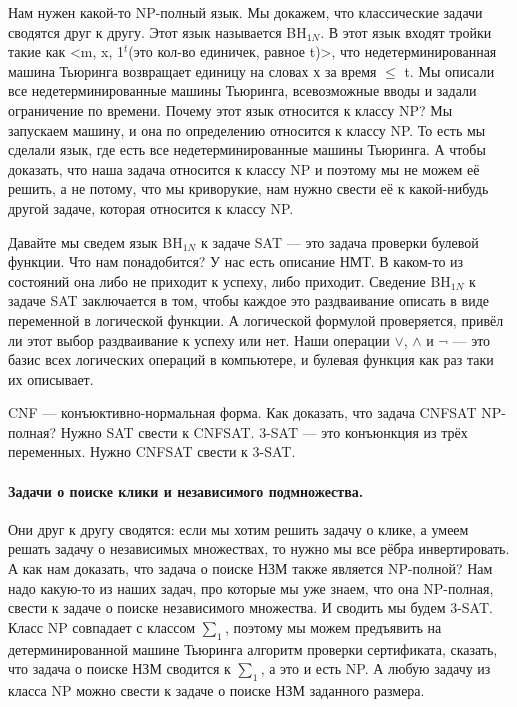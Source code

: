 \documentclass[12pt]{article}
\begin{document}
Нам нужен какой-то NP-полный язык. Мы докажем, что классические задачи сводятся друг к другу. Этот язык называется BH$_{1N}$. В этот язык входят тройки такие как <m, x, 1$^t$(это кол-во единичек, равное t)>, что недетерминированная машина Тьюринга возвращает единицу на словах х за время $\leq$ t. Мы описали все недетерминированные машины Тьюринга, всевозможные вводы и задали ограничение по времени. Почему этот язык относится к классу NP? Мы запускаем машину, и она по определению относится к классу NP. То есть мы сделали язык, где есть все недетерминированные машины Тьюринга. А чтобы доказать, что наша задача относится к классу NP и поэтому мы не можем её решить, а не потому, что мы криворукие, нам нужно свести её к какой-нибудь другой задаче, которая относится к классу NP.

Давайте мы сведем язык BH$_{1N}$ к задаче SAT --- это задача проверки булевой функции. Что нам понадобится? У нас есть описание НМТ. В каком-то из состояний она либо не приходит к успеху, либо приходит. Сведение BH$_{1N}$ к задаче SAT заключается в том, чтобы каждое это раздваивание описать в виде переменной в логической функции. А логической формулой проверяется, привёл ли этот выбор раздваивание к успеху или нет. Наши операции $\lor$, $\land$ и $\lnot$ --- это базис всех логических операций в компьютере, и булевая функция как раз таки их описывает.

CNF --- конъюктивно-нормальная форма. Как доказать, что задача CNFSAT NP-полная? Нужно SAT свести к CNFSAT. 3-SAT --- это конъюнкция из трёх переменных. Нужно CNFSAT свести к 3-SAT.

\paragraph{Задачи о поиске клики и независимого подмножества.} Они друг к другу сводятся: если мы хотим решить задачу о клике, а умеем решать задачу о независимых множествах, то нужно мы все рёбра инвертировать. А как нам доказать, что задача о поиске НЗМ также является NP-полной? Нам надо какую-то из наших задач, про которые мы уже знаем, что она NP-полная, свести к задаче о поиске независимого множества. И сводить мы будем 3-SAT. Класс NP совпадает с классом $\sum_1$, поэтому мы можем предъявить на детерминированной машине Тьюринга алгоритм проверки сертификата, сказать, что задача о поиске НЗМ сводится к $\sum_1$, а это и есть NP. А любую задачу из класса NP можно свести к задаче о поиске НЗМ заданного размера.
\end{document}
